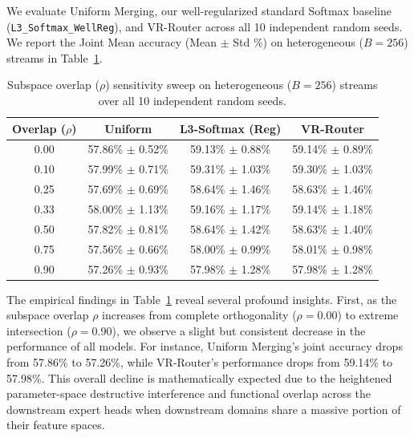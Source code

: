 We evaluate Uniform Merging, our well-regularized standard Softmax baseline (\texttt{L3\_Softmax\_WellReg}), and VR-Router across all 10 independent random seeds. We report the Joint Mean accuracy (Mean $\pm$ Std \%) on heterogeneous ($B=256$) streams in Table~\ref{tab:overlap_sweep}.

\begin{table}[h]
\caption{Subspace overlap ($\rho$) sensitivity sweep on heterogeneous ($B=256$) streams over all 10 independent random seeds.}
\label{tab:overlap_sweep}
\vskip 0.15in
\begin{center}
\begin{small}
\begin{sc}
\setlength{\tabcolsep}{5pt}
\begin{tabular}{cccc}
\toprule
Overlap ($\rho$) & Uniform & L3-Softmax (Reg) & VR-Router \\
\midrule
0.00 & 57.86\% $\pm$ 0.52\% & 59.13\% $\pm$ 0.88\% & 59.14\% $\pm$ 0.89\% \\
0.10 & 57.99\% $\pm$ 0.71\% & 59.31\% $\pm$ 1.03\% & 59.30\% $\pm$ 1.03\% \\
0.25 & 57.69\% $\pm$ 0.69\% & 58.64\% $\pm$ 1.46\% & 58.63\% $\pm$ 1.46\% \\
0.33 & 58.00\% $\pm$ 1.13\% & 59.16\% $\pm$ 1.17\% & 59.14\% $\pm$ 1.18\% \\
0.50 & 57.82\% $\pm$ 0.81\% & 58.64\% $\pm$ 1.42\% & 58.63\% $\pm$ 1.40\% \\
0.75 & 57.56\% $\pm$ 0.66\% & 58.00\% $\pm$ 0.99\% & 58.01\% $\pm$ 0.98\% \\
0.90 & 57.26\% $\pm$ 0.93\% & 57.98\% $\pm$ 1.28\% & 57.98\% $\pm$ 1.28\% \\
\bottomrule
\end{tabular}
\end{sc}
\end{small}
\end{center}
\vskip -0.1in
\end{table}

The empirical findings in Table~\ref{tab:overlap_sweep} reveal several profound insights. First, as the subspace overlap $\rho$ increases from complete orthogonality ($\rho = 0.00$) to extreme intersection ($\rho = 0.90$), we observe a slight but consistent decrease in the performance of all models. For instance, Uniform Merging's joint accuracy drops from 57.86\% to 57.26\%, while VR-Router's performance drops from 59.14\% to 57.98\%. This overall decline is mathematically expected due to the heightened parameter-space destructive interference and functional overlap across the downstream expert heads when downstream domains share a massive portion of their feature spaces.

